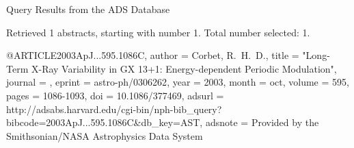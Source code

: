 Query Results from the ADS Database


Retrieved 1 abstracts, starting with number 1.  Total number selected: 1.

@ARTICLE{2003ApJ...595.1086C,
   author = {{Corbet}, R.~H.~D.},
    title = "{Long-Term X-Ray Variability in GX 13+1: Energy-dependent Periodic Modulation}",
  journal = {\apj},
   eprint = {astro-ph/0306262},
     year = 2003,
    month = oct,
   volume = 595,
    pages = {1086-1093},
      doi = {10.1086/377469},
   adsurl = {http://adsabs.harvard.edu/cgi-bin/nph-bib_query?bibcode=2003ApJ...595.1086C&db_key=AST},
  adsnote = {Provided by the Smithsonian/NASA Astrophysics Data System}
}



